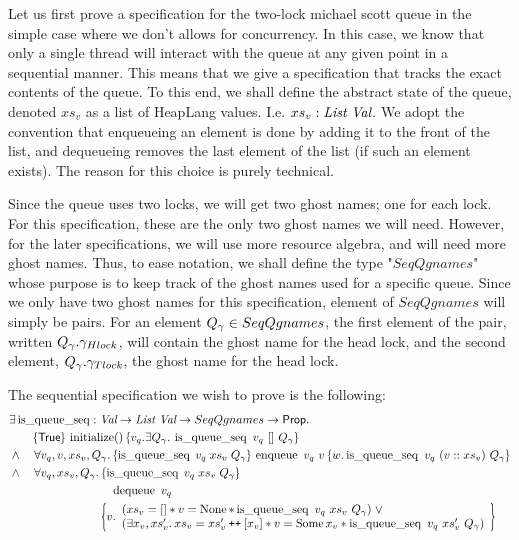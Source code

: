 \documentclass[twoside,11pt,openright]{report}
\newcommand{\initialise}{\operatorname{initialize}}
\newcommand{\enqueue}{\operatorname{enqueue}}
\newcommand{\dequeue}{\operatorname{dequeue}}
\newcommand{\isqueueseq}{\operatorname{is\_queue\_seq}}
\newcommand\catenate{\mathbin{\text{\ttfamily\upshape ++}}}
\begin{document}
Let us first prove a specification for the two-lock michael scott queue in the simple case where we don't allows for concurrency. In this case, we know that only a single thread will interact with the queue at any given point in a sequential manner. This means that we give a specification that tracks the exact contents of the queue. To this end, we shall define the abstract state of the queue, denoted $xs_v$ as a list of HeapLang values. I.e. $xs_v : \textit{List} \ \textit{Val}$. We adopt the convention that enqueueing an element is done by adding it to the front of the list, and dequeueing removes the last element of the list (if such an element exists). The reason for this choice is purely technical.

Since the queue uses two locks, we will get two ghost names; one for each lock. For this specification, these are the only two ghost names we will need. However, for the later specifications, we will use more resource algebra, and will need more ghost names. Thus, to ease notation, we shall define the type "$SeqQgnames$" whose purpose is to keep track of the ghost names used for a specific queue. Since we only have two ghost names for this specification, element of $SeqQgnames$ will simply be pairs. For an element $Q_\gamma \in SeqQgnames$, the first element of the pair, written $Q_\gamma.\gamma_{Hlock}$, will contain the ghost name for the head lock, and the second element, $Q_\gamma.\gamma_{Tlock}$, the ghost name for the head lock.

The sequential specification we wish to prove is the following:
\begin{align*}
  &\Exists \isqueueseq : \Val \to \List \ \Val \to SeqQgnames \to \Prop.\\
  &\quad\quad\hoare{\TRUE}{\initialise \TT}{v_q . \Exists Q_\gname. \isqueueseq\ v_q\ []\ Q_\gname}\\
  &\land\quad\All v_q, v, xs_v, Q_\gname. \hoare{\isqueueseq \; v_q \; xs_v \; Q_\gname}{\enqueue\ v_q\ v}{w . \isqueueseq\ v_q\ (v :: xs_v)\ Q_\gname}\\
  &\land\quad\All v_q, xs_v, Q_\gname. \hoareV[t]{\isqueueseq \; v_q \; xs_v \; Q_\gname}{\dequeue\ v_q}{v . \begin{array}{l}(xs_v = [] \ast v = \None \ast \isqueueseq\ v_q\ xs_v\ Q_\gname) \; \lor\\ (\Exists x_v, xs_v' . xs_v = xs_v' \catenate [x_v] \ast v = \Some x_v \ast \isqueueseq\ v_q\ xs_v'\ Q_\gname) \end{array}}
\end{align*}
\end{document}
